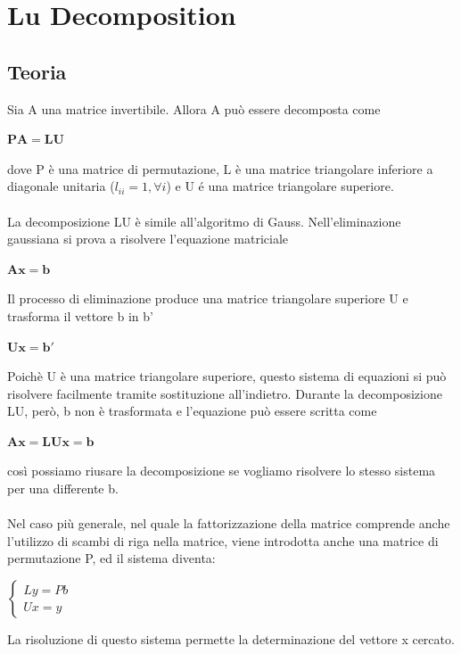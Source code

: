 \documentclass[12pt]{article}
\begin{document}
\maketitle
\tableofcontents

\section{Lu Decomposition}
\subsection{Teoria}
Sia A una matrice invertibile. Allora A pu\`o essere decomposta come
\begin{center} $\mathbf{PA} = \mathbf{LU}$ \end{center}
dove P \`e una matrice di permutazione, L \`e una matrice triangolare inferiore a diagonale unitaria ($l_{ii} = 1, \forall i$) e U \'e una matrice triangolare superiore. \\\\
La decomposizione LU \`e simile all'algoritmo di Gauss. Nell'eliminazione gaussiana si prova a risolvere l'equazione matriciale
\begin{center} $\mathbf{A} \mathbf{x} = \mathbf{b}$ \end{center}
Il processo di eliminazione produce una matrice triangolare superiore U e trasforma il vettore b in b'
\begin{center} $\mathbf{U} \mathbf{x} = \mathbf{b}'$ \end{center}
Poich\`e U \`e una matrice triangolare superiore, questo sistema di equazioni si pu\`o risolvere facilmente tramite sostituzione all'indietro.
Durante la decomposizione LU, per\`o, b non \`e trasformata e l'equazione pu\`o essere scritta come
\begin{center} $\mathbf{A} \mathbf{x} = \mathbf{L} \mathbf{U} \mathbf{x} = \mathbf{b}$ \end{center}
cos\`i possiamo riusare la decomposizione se vogliamo risolvere lo stesso sistema per una differente b. \\\\
Nel caso pi\`u generale, nel quale la fattorizzazione della matrice comprende anche l'utilizzo di scambi di riga nella matrice, viene introdotta anche una matrice di permutazione P, ed il sistema diventa:
\begin{center} $\left\{ \begin{array}{l} Ly=Pb\\ Ux=y\end{array}\right.$ \end{center}
La risoluzione di questo sistema permette la determinazione del vettore x cercato.
\end{document}
